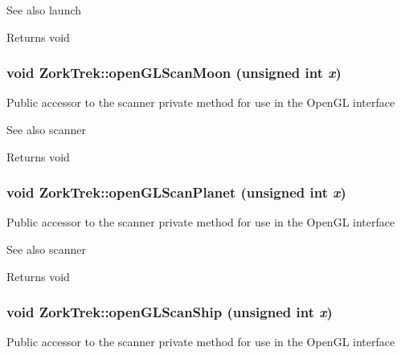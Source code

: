 \begin{DoxySeeAlso}{See also}
launch
\end{DoxySeeAlso}
\begin{DoxyReturn}{Returns}
void 
\end{DoxyReturn}
\hypertarget{classZorkTrek_accb64b4d5c3ed0e331d8d2fb698dd0ec}{
\subsubsection[{openGLScanMoon}]{\setlength{\rightskip}{0pt plus 5cm}void ZorkTrek::openGLScanMoon (unsigned int {\em x})}}
\label{d6/df9/classZorkTrek_accb64b4d5c3ed0e331d8d2fb698dd0ec}
Public accessor to the scanner private method for use in the OpenGL interface

\begin{DoxySeeAlso}{See also}
scanner
\end{DoxySeeAlso}
\begin{DoxyReturn}{Returns}
void 
\end{DoxyReturn}
\hypertarget{classZorkTrek_a6801854e2674fcac922dd61e07f39e95}{
\subsubsection[{openGLScanPlanet}]{\setlength{\rightskip}{0pt plus 5cm}void ZorkTrek::openGLScanPlanet (unsigned int {\em x})}}
\label{d6/df9/classZorkTrek_a6801854e2674fcac922dd61e07f39e95}
Public accessor to the scanner private method for use in the OpenGL interface

\begin{DoxySeeAlso}{See also}
scanner
\end{DoxySeeAlso}
\begin{DoxyReturn}{Returns}
void 
\end{DoxyReturn}
\hypertarget{classZorkTrek_ae1396640eabe5971dfe3c2d5a1d747ca}{
\subsubsection[{openGLScanShip}]{\setlength{\rightskip}{0pt plus 5cm}void ZorkTrek::openGLScanShip (unsigned int {\em x})}}
\label{d6/df9/classZorkTrek_ae1396640eabe5971dfe3c2d5a1d747ca}
Public accessor to the scanner private method for use in the OpenGL interface

